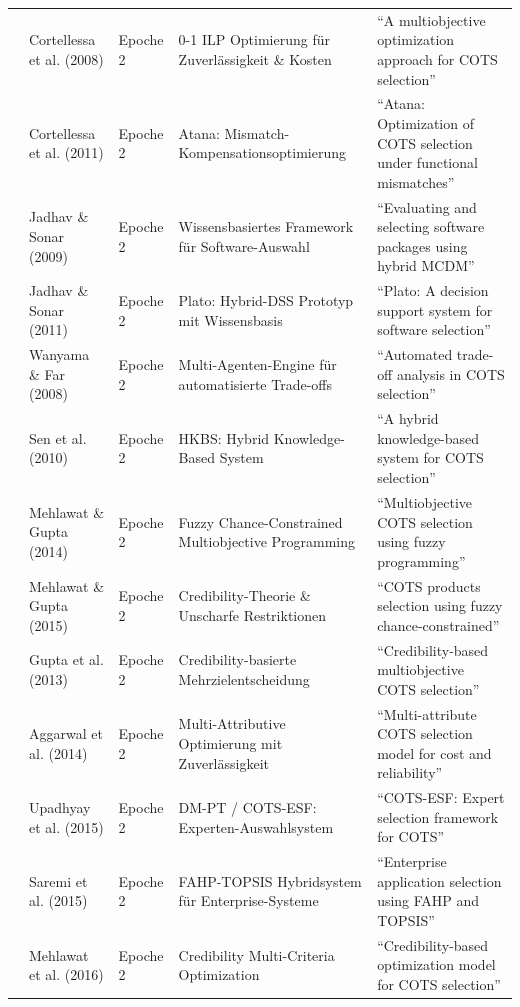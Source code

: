 \begin{longtable}{p{2.2cm} p{2.8cm} p{1.8cm} p{4.2cm} p{3.5cm}}
\cite{VUVLUN85} & Cortellessa et al. (2008) & Epoche 2 & 0-1 ILP Optimierung für Zuverlässigkeit \& Kosten & \enquote{A multiobjective optimization approach for COTS selection} \\
\cite{MZ8JHDYA} & Cortellessa et al. (2011) & Epoche 2 & Atana: Mismatch-Kompensationsoptimierung & \enquote{Atana: Optimization of COTS selection under functional mismatches} \\
\cite{CI86GRRG} & Jadhav \& Sonar (2009) & Epoche 2 & Wissensbasiertes Framework für Software-Auswahl & \enquote{Evaluating and selecting software packages using hybrid MCDM} \\
\cite{8VHUMEKY} & Jadhav \& Sonar (2011) & Epoche 2 & Plato: Hybrid-DSS Prototyp mit Wissensbasis & \enquote{Plato: A decision support system for software selection} \\
\cite{WBGP3ETU} & Wanyama \& Far (2008) & Epoche 2 & Multi-Agenten-Engine für automatisierte Trade-offs & \enquote{Automated trade-off analysis in COTS selection} \\
\cite{U4E7VXQU} & Sen et al. (2010) & Epoche 2 & HKBS: Hybrid Knowledge-Based System & \enquote{A hybrid knowledge-based system for COTS selection} \\
\cite{6YJHIVHG} & Mehlawat \& Gupta (2014) & Epoche 2 & Fuzzy Chance-Constrained Multiobjective Programming & \enquote{Multiobjective COTS selection using fuzzy programming} \\
\cite{B7ZTQCZZ} & Mehlawat \& Gupta (2015) & Epoche 2 & Credibility-Theorie \& Unscharfe Restriktionen & \enquote{COTS products selection using fuzzy chance-constrained} \\
\cite{VRTXHQI7} & Gupta et al. (2013) & Epoche 2 & Credibility-basierte Mehrzielentscheidung & \enquote{Credibility-based multiobjective COTS selection} \\
\cite{W8P543Y2} & Aggarwal et al. (2014) & Epoche 2 & Multi-Attributive Optimierung mit Zuverlässigkeit & \enquote{Multi-attribute COTS selection model for cost and reliability} \\
\cite{WZM7DUBY} & Upadhyay et al. (2015) & Epoche 2 & DM-PT / COTS-ESF: Experten-Auswahlsystem & \enquote{COTS-ESF: Expert selection framework for COTS} \\
\cite{LYMHTPXS} & Saremi et al. (2015) & Epoche 2 & FAHP-TOPSIS Hybridsystem für Enterprise-Systeme & \enquote{Enterprise application selection using FAHP and TOPSIS} \\
\cite{JX4RDRDU} & Mehlawat et al. (2016) & Epoche 2 & Credibility Multi-Criteria Optimization & \enquote{Credibility-based optimization model for COTS selection} \\

\end{longtable}

